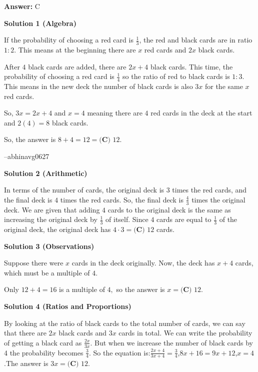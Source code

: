 \begin{enumerate}
 \textbf{Answer: }C



\textbf{Solution 1 (Algebra)}

If the probability of choosing a red card is $\frac{1}{3}$, the red and black cards are in ratio $1:2$. This means at the beginning there are $x$ red cards and $2x$ black cards.

 After $4$ black cards are added, there are $2x+4$ black cards. This time, the probability of choosing a red card is $\frac{1}{4}$ so the ratio of red to black cards is $1:3$. This means in the new deck the number of black cards is also $3x$ for the same $x$ red cards.

 So, $3x = 2x + 4$ and $x=4$ meaning there are $4$ red cards in the deck at the start and $2(4) = 8$ black cards. 

 So, the answer is $8+4 = 12 = \boxed{\textbf{(C) }12}$.

 --abhinavg0627

 



\textbf{Solution 2 (Arithmetic)}

In terms of the number of cards, the original deck is $3$ times the red cards, and the final deck is $4$ times the red cards. So, the final deck is $\frac43$ times the original deck. We are given that adding $4$ cards to the original deck is the same as increasing the original deck by $\frac13$ of itself. Since $4$ cards are equal to $\frac13$ of the original deck, the original deck has $4\cdot3=\boxed{\textbf{(C) }12}$ cards.

 



\textbf{Solution 3 (Observations)}

Suppose there were $x$ cards in the deck originally. Now, the deck has $x+4$ cards, which must be a multiple of $4.$

 Only $12+4=16$ is a multiple of $4,$ so the answer is $x=\boxed{\textbf{(C) }12}.$




\textbf{Solution 4 (Ratios and Proportions)}

By looking at the ratio of black cards to the total number of cards, we can say that there are $2x$ black cards and $3x$ cards in total. We can write the probability of getting a black card as $\frac{2x}{3x}$. But when we increase the number of black cards by 4 the probability becomes $\frac{3}{4}$. So the equation is:$\frac{2x+4}{3x+4}=\frac{3}{4}$,$8x+16=9x+12$,$x=4$.The answer is $3x=\boxed{\textbf{(C) }12}.$





\end{enumerate}
